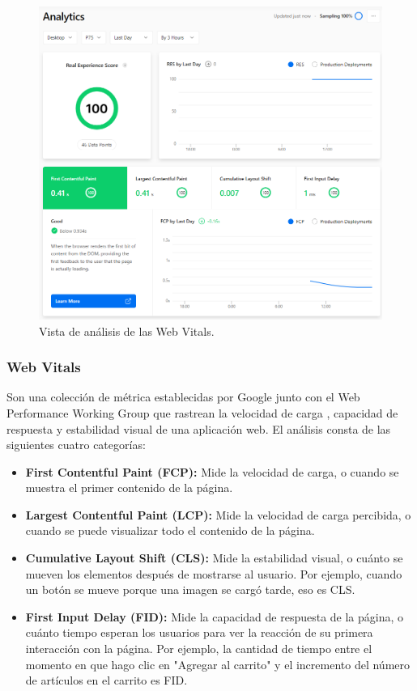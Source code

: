 \documentclass[12pt,twoside,titlepage]{report}
\begin{document}
\begin{figure}[H]
    \centering
    \includegraphics[scale=0.5]{Vercel/RealExperienceScore}
    \caption{Vista de análisis de las Web Vitals.}
    \label{fig:Vercel_metrics}
\end{figure}

\subsubsection{Web Vitals}

Son una colección de métrica establecidas por Google \cite{webdev} junto con el Web Performance Working Group \cite{w3} que rastrean la velocidad de carga , capacidad de respuesta y estabilidad visual de una aplicación web. El análisis consta de las siguientes cuatro categorías:

\begin{itemize}
    \item\textbf{First Contentful Paint (FCP):} Mide la velocidad de carga, o cuando se muestra el primer contenido de la página.
    \item\textbf{Largest Contentful Paint (LCP):} Mide la velocidad de carga percibida, o cuando se puede visualizar todo el contenido de la página.
    \item\textbf{Cumulative Layout Shift (CLS):} Mide la estabilidad visual, o cuánto se mueven los elementos después de mostrarse al usuario. Por ejemplo, cuando un botón se mueve porque una imagen se cargó tarde, eso es CLS.
    \item\textbf{First Input Delay (FID):} Mide la capacidad de respuesta de la página, o cuánto tiempo esperan los usuarios para ver la reacción de su primera interacción con la página. Por ejemplo, la cantidad de tiempo entre el momento en que hago clic en "Agregar al carrito" y el incremento del número de artículos en el carrito es FID.
\end{itemize}
\end{document}
